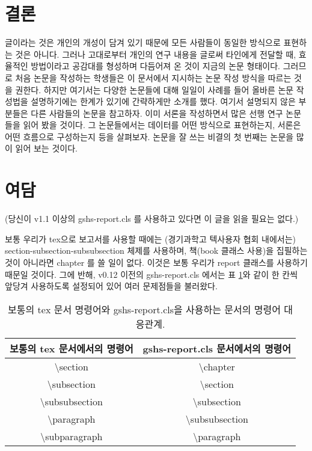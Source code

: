 \documentclass{gshs-report-v1.1}
\begin{document}

\section{결론}
글이라는 것은 개인의 개성이 담겨 있기 때문에 모든 사람들이 동일한 방식으로 표현하는 것은 아니다. 그러나 고대로부터 개인의 연구 내용을 글로써 타인에게 전달할 때, 효율적인 방법이라고 공감대를 형성하며 다듬어져 온 것이 지금의 논문 형태이다. 그러므로 처음 논문을 작성하는 학생들은 이 문서에서 지시하는 논문 작성 방식을 따르는 것을 권한다. 하지만 여기서는 다양한 논문들에 대해 일일이 사례를 들어 올바른 논문 작성법을 설명하기에는 한계가 있기에 간략하게만 소개를 했다. 여기서 설명되지 않은 부분들은 다른 사람들의 논문을 참고하자. 이미 서론을 작성하면서 많은 선행 연구 논문들을 읽어 봤을 것이다. 그 논문들에서는 데이터를 어떤 방식으로 표현하는지, 서론은 어떤 흐름으로 구성하는지 등을 살펴보자. 논문을 잘 쓰는 비결의 첫 번째는 논문을 많이 읽어 보는 것이다.




\section{여담}
(당신이 v1.1 이상의 gshs-report.cls 를 사용하고 있다면 이 글을 읽을 필요는 없다.)

보통 우리가 tex으로 보고서를 사용할 때에는 (경기과학고 텍사용자 협회 내에서는) section-subsection-subsubsection 체제를 사용하며, 책(book 클래스 사용)을 집필하는 것이 아니라면 chapter 를 쓸 일이 없다. 이것은 보통 우리가 report 클래스를 사용하기 때문일 것이다. 그에 반해, v0.12 이전의 gshs-report.cls 에서는 표 \ref{correlation}와 같이 한 칸씩 앞당겨 사용하도록 설정되어 있어 여러 문제점들을 불러왔다.

\begin{table}[h]
	\caption{보통의 tex 문서 명령어와 gshs-report.cls을 사용하는 문서의 명령어 대응관계.}
	\label{correlation}
	\begin{center}
		\begin{tabular}{|c|c|}
			\hline
			보통의 tex 문서에서의 명령어 & gshs-report.cls 문서에서의 명령어 \\
			\hline
			\textbackslash section & \textbackslash chapter \\
			\hline
			\textbackslash subsection & \textbackslash section \\
			\hline
			\textbackslash subsubsection & \textbackslash subsection \\
			\hline
			\textbackslash paragraph & \textbackslash subsubsection \\
			\hline
			\textbackslash subparagraph & \textbackslash paragraph \\
			\hline
		\end{tabular}
	\end{center}
\end{table}
\end{document}
